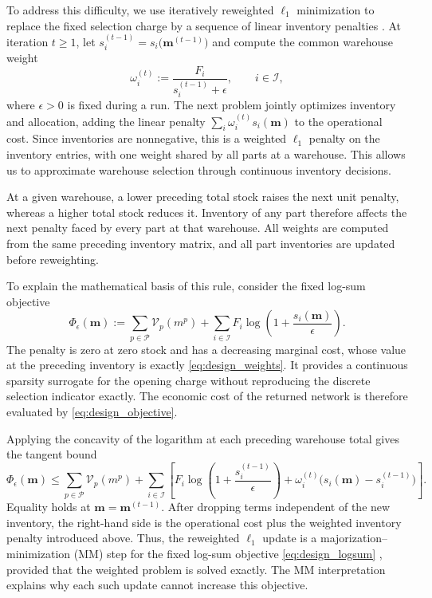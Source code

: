 \documentclass[a4paper,fleqn]{cas-sc}
\theoremstyle{remark}
\theoremstyle{plain}
\begin{document}
To address this difficulty, we use iteratively reweighted $\ell_1$ minimization to replace the fixed selection charge by a sequence of linear inventory penalties \citep{candes2008enhancing}. At iteration $t\ge1$, let $s_i^{(t-1)}=s_i\bigl(\mathbf m^{(t-1)}\bigr)$ and compute the common warehouse weight
\begin{equation}
    \omega_i^{(t)}:=\frac{F_i}{s_i^{(t-1)}+\epsilon},\qquad i\in\mathcal I,
    \label{eq:design_weights}
\end{equation}
where $\epsilon>0$ is fixed during a run. The next problem jointly optimizes inventory and allocation, adding the linear penalty $\sum_i\omega_i^{(t)}s_i(\mathbf m)$ to the operational cost. Since inventories are nonnegative, this is a weighted $\ell_1$ penalty on the inventory entries, with one weight shared by all parts at a warehouse. This allows us to approximate warehouse selection through continuous inventory decisions.

At a given warehouse, a lower preceding total stock raises the next unit penalty, whereas a higher total stock reduces it. Inventory of any part therefore affects the next penalty faced by every part at that warehouse. All weights are computed from the same preceding inventory matrix, and all part inventories are updated before reweighting.

To explain the mathematical basis of this rule, consider the fixed log-sum objective
\begin{equation}
    \Phi_\epsilon(\mathbf m):=\sum_{p\in\mathcal P}\mathcal V_p(m^p)
        +\sum_{i\in\mathcal I}F_i\log\left(1+\frac{s_i(\mathbf m)}{\epsilon}\right).
    \label{eq:design_logsum}
\end{equation}
The penalty is zero at zero stock and has a decreasing marginal cost, whose value at the preceding inventory is exactly \eqref{eq:design_weights}. It provides a continuous sparsity surrogate for the opening charge without reproducing the discrete selection indicator exactly. The economic cost of the returned network is therefore evaluated by \eqref{eq:design_objective}.

Applying the concavity of the logarithm at each preceding warehouse total gives the tangent bound
\begin{equation}
    \Phi_\epsilon(\mathbf m)\le\sum_{p\in\mathcal P}\mathcal V_p(m^p)
       +\sum_{i\in\mathcal I}\left[F_i\log\left(1+\frac{s_i^{(t-1)}}{\epsilon}\right)
           +\omega_i^{(t)}\bigl(s_i(\mathbf m)-s_i^{(t-1)}\bigr)\right].
\label{eq:design_majorization}
\end{equation}
Equality holds at $\mathbf m=\mathbf m^{(t-1)}$. After dropping terms independent of the new inventory, the right-hand side is the operational cost plus the weighted inventory penalty introduced above. Thus, the reweighted $\ell_1$ update is a majorization--minimization (MM) step for the fixed log-sum objective \eqref{eq:design_logsum} \citep{hunter2004tutorial}, provided that the weighted problem is solved exactly. The MM interpretation explains why each such update cannot increase this objective.
\end{document}
